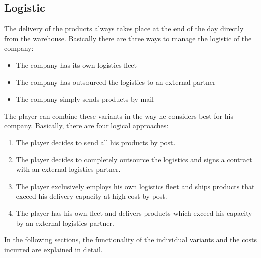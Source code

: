 \subsection{Logistic} \label{logistic_simulation}



The delivery of the products always takes place at the end of the day directly from the warehouse. Basically there are three ways to manage the logistic of the company: 
\begin{itemize}
    \item The company has its own logistics fleet
    \item The company has outsourced the logistics to an external partner
    \item The company simply sends products by mail
\end{itemize}

The player can combine these variants in the way he considers best for his company. Basically, there are four logical approaches:
\begin{enumerate}
    \item The player decides to send all his products by post.
    \item The player decides to completely outsource the logistics and signs a contract with an external logistics partner.
    \item The player exclusively employs his own logistics fleet and ships products that exceed his delivery capacity at high cost by post.
    \item The player has his own fleet and delivers products which exceed his capacity by an external logistics partner.
\end{enumerate}
	
In the following sections, the functionality of the individual variants and the costs incurred are explained in detail.


